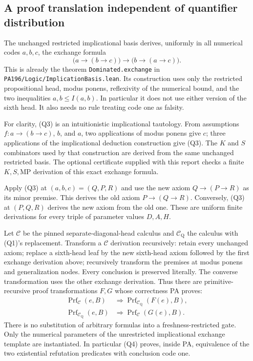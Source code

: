 \subsection{A proof translation independent of quantifier distribution}

The unchanged restricted implicational basis derives, uniformly in
all numerical codes $a,b,c$, the exchange formula
\[
 \bigl(a\to(b\to c)\bigr)\to
                  \bigl(b\to(a\to c)\bigr).
\tag{Q3}
\]
This is already the theorem \texttt{Dominated.exchange} in
\texttt{PA196/Logic/ImplicationBasis.lean}. Its construction uses only
the restricted propositional head, modus ponens, reflexivity of the
numerical bound, and the two inequalities
$a,b\le I(a,b)$. In particular it does not use either version of the
sixth head. It also needs no rule treating code one as falsity.

For clarity, (Q3) is an intuitionistic implicational tautology. From
assumptions $f:a\to(b\to c)$, $b$, and $a$, two applications of modus
ponens give $c$; three applications of the implicational deduction
construction give (Q3). The $K$ and $S$ combinators used by that
construction are derived from the same unchanged restricted basis.
The optional certificate supplied with this report checks a finite
$K,S,\mathrm{MP}$ derivation of this exact exchange formula.

Apply (Q3) at $(a,b,c)=(Q,P,R)$ and use the new axiom
$Q\to(P\to R)$ as its minor premise. This derives the old axiom
$P\to(Q\to R)$. Conversely, (Q3) at $(P,Q,R)$ derives the new axiom
from the old one. These are uniform finite derivations for every
triple of parameter values $D,A,H$.

Let $\mathcal C$ be the pinned separate-diagonal-head calculus and
$\mathcal C_{\mathrm Q}$ the calculus with (Q1)'s replacement.
Transform a $\mathcal C$ derivation recursively: retain every
unchanged axiom; replace a sixth-head leaf by the new sixth-head
axiom followed by the first exchange derivation above; recursively
transform the premises at modus ponens and generalization nodes.
Every conclusion is preserved literally. The converse transformation
uses the other exchange derivation. Thus there are primitive-recursive
proof transformations $F,G$ whose correctness PA proves:
\[
\begin{aligned}
 \operatorname{Prf}_{\mathcal C}(e,B)
   &\Longrightarrow
       \operatorname{Prf}_{\mathcal C_{\mathrm Q}}(F(e),B),\\
 \operatorname{Prf}_{\mathcal C_{\mathrm Q}}(e,B)
   &\Longrightarrow
       \operatorname{Prf}_{\mathcal C}(G(e),B).
\end{aligned}
\tag{Q4}
\]
There is no substitution of arbitrary formulas into a
freshness-restricted gate. Only the numerical parameters of the
unrestricted implicational exchange template are instantiated.
In particular (Q4) proves, inside PA, equivalence of the two
existential refutation predicates with conclusion code one.


